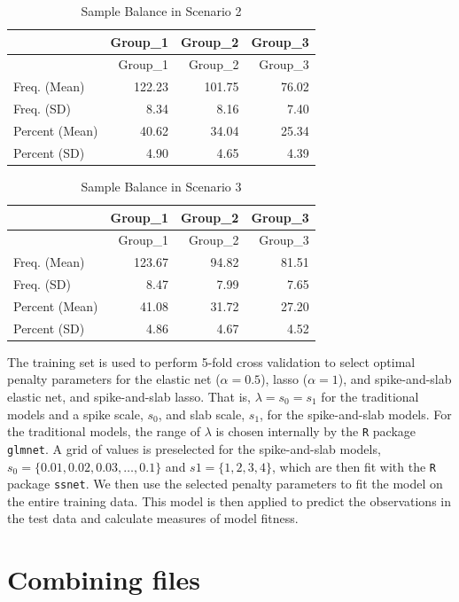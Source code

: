 \documentclass[
]{article}
\begin{document}
\begin{longtable}[]{@{}lrrr@{}}
\caption{Sample Balance in Scenario 2}\tabularnewline
\toprule
& Group\_1 & Group\_2 & Group\_3 \\
\midrule
\endfirsthead
\toprule
& Group\_1 & Group\_2 & Group\_3 \\
\midrule
\endhead
Freq. (Mean) & 122.23 & 101.75 & 76.02 \\
Freq. (SD) & 8.34 & 8.16 & 7.40 \\
Percent (Mean) & 40.62 & 34.04 & 25.34 \\
Percent (SD) & 4.90 & 4.65 & 4.39 \\
\bottomrule
\end{longtable}

\begin{longtable}[]{@{}lrrr@{}}
\caption{Sample Balance in Scenario 3}\tabularnewline
\toprule
& Group\_1 & Group\_2 & Group\_3 \\
\midrule
\endfirsthead
\toprule
& Group\_1 & Group\_2 & Group\_3 \\
\midrule
\endhead
Freq. (Mean) & 123.67 & 94.82 & 81.51 \\
Freq. (SD) & 8.47 & 7.99 & 7.65 \\
Percent (Mean) & 41.08 & 31.72 & 27.20 \\
Percent (SD) & 4.86 & 4.67 & 4.52 \\
\bottomrule
\end{longtable}

The training set is used to perform 5-fold cross validation to select
optimal penalty parameters for the elastic net (\(\alpha = 0.5\)), lasso
(\(\alpha = 1\)), and spike-and-slab elastic net, and spike-and-slab
lasso. That is, \(\lambda = s_0 = s_1\) for the traditional models and a
spike scale, \(s_0\), and slab scale, \(s_1\), for the spike-and-slab
models. For the traditional models, the range of \(\lambda\) is chosen
internally by the \texttt{R} package \texttt{glmnet}. A grid of values
is preselected for the spike-and-slab models,
\(s_0 = \{0.01, 0.02, 0.03, \dots, 0.1 \}\) and \(s1 = \{1, 2, 3, 4\}\),
which are then fit with the \texttt{R} package \texttt{ssnet}. We then
use the selected penalty parameters to fit the model on the entire
training data. This model is then applied to predict the observations in
the test data and calculate measures of model fitness.

\hypertarget{combining-files}{%
\section{Combining files}\label{combining-files}}
\end{document}
